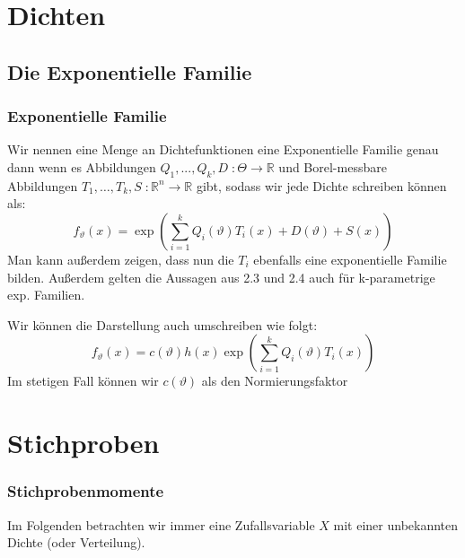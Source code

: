 \documentclass[a4paper]{article}
\begin{document}
\section{Dichten}
\subsection{Die Exponentielle Familie}

\begin{theorem} %
	\subsubsection{Exponentielle Familie}

	Wir nennen eine Menge an Dichtefunktionen eine Exponentielle Familie genau dann wenn
	es Abbildungen $Q_1, ..., Q_k, D \; : \Theta \to \mathbb{R}$ und Borel-messbare
	Abbildungen $T_1, \ldots, T_k, S \; : \mathbb{R} ^{n} \to \mathbb{R}$ gibt, sodass wir
	jede Dichte schreiben können als:
	\[
		f_{\vartheta} (x) = \exp \left(
			\sum_{i=1}^{k} Q_i (\vartheta) T_i (x) + D(\vartheta) + S(x)
		\right) 
	\]
	Man kann außerdem zeigen, dass nun die $T_i$ ebenfalls eine exponentielle Familie bilden.
	Außerdem gelten die Aussagen aus 2.3 und 2.4 auch für k-parametrige exp. Familien.

	Wir können die Darstellung auch umschreiben wie folgt:
	\[
		f_\vartheta (x) = c(\vartheta) h(x) \exp(\sum_{i=1}^{k} Q_i (\vartheta) T_i (x))
	\] 
	Im stetigen Fall können wir $c (\vartheta)$ als den Normierungsfaktor
\end{theorem}

\section{Stichproben}

\begin{theorem} %
	\subsubsection{Stichprobenmomente}

	Im Folgenden betrachten wir immer eine Zufallsvariable $X$ mit einer unbekannten
	Dichte (oder Verteilung).
\end{theorem}
\end{document}
